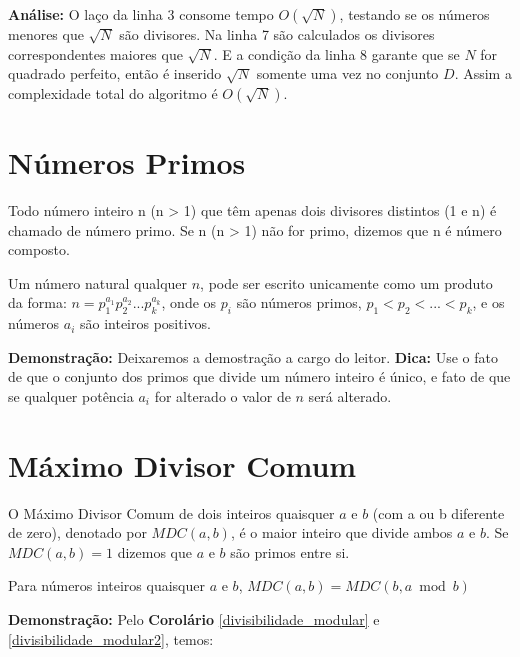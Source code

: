 \textbf{Análise:}
O laço da linha 3 consome tempo  $O(\sqrt{N})$, testando se os números menores que $\sqrt{N}$ são divisores. Na linha 7 são calculados os divisores correspondentes maiores 
que $\sqrt{N}$. E a condição da linha 8 garante que se $N$ for quadrado perfeito, então é inserido $\sqrt{N}$ somente uma vez no conjunto $D$.
Assim a complexidade total do algoritmo é $O(\sqrt{N})$.




\section{Números Primos}

\begin{definition} 
Todo número inteiro n (n > 1) que têm apenas dois divisores distintos (1 e n) é chamado de número primo. Se n (n > 1) não for primo, dizemos que n é número composto.
\end{definition}


\begin{theorem}\label{fatoracao_unica}
Um número natural qualquer $n$, pode ser escrito unicamente como um produto da forma: 
$n = p_1^{a_1}p_2^{a_2}...p_k^{a_k}$, onde os $p_i$ são números primos, $p_1 < p_2 < ... < p_k$, e os números $a_i$ são inteiros positivos.
\end{theorem}
\textbf{Demonstração:}
Deixaremos a demostração a cargo do leitor.
\textbf{Dica:} Use o fato de que o conjunto dos primos que divide um número inteiro é único, e fato de que se qualquer potência $a_i$ for alterado o valor de $n$ será alterado.



\section{Máximo Divisor Comum}

\begin{definition}
O Máximo Divisor Comum de dois inteiros quaisquer $a$ e $b$ (com a ou b diferente de zero), denotado por $MDC(a,b)$, é o maior inteiro que divide ambos $a$ e $b$. 
Se $MDC(a,b) = 1$ dizemos que $a$ e $b$ são primos entre si.
\end{definition}


\begin{corollary}\label{gcd_modular}
Para números inteiros quaisquer $a$ e $b$, $MDC(a,b) = MDC(b, a \bmod b)$
\end{corollary}
\textbf{Demonstração:}
Pelo \textbf{Corolário} \autoref{divisibilidade_modular} e \autoref{divisibilidade_modular2}, temos:

